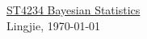 \documentclass[a4paper,12pt,landscape]{article}
\begin{document}
\raggedright
\footnotesize
\begin{multicols}{2}


    \setlength{\columnseprule}{0.25pt}
    \setlength{\premulticols}{1pt}
    \setlength{\postmulticols}{1pt}
    \setlength{\multicolsep}{1pt}
    \setlength{\columnsep}{2pt}

    \begin{center}
        \Large{\underline{ST4234 Bayesian Statistics}} \\
        {Lingjie, \today}
    \end{center}

    

    

    

    

    

\end{multicols}
\end{document}
